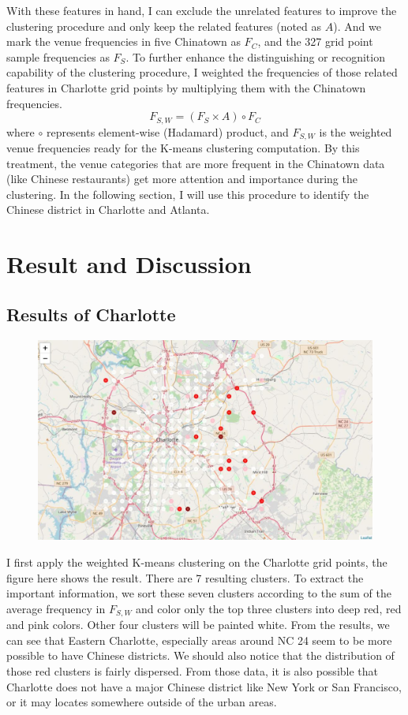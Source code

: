 \documentclass{article}
\begin{document}
With these features in hand, I can exclude the unrelated features to improve the clustering procedure and only keep the related features (noted as $A$).
And we mark the venue frequencies in five Chinatown as $F_C$, and the 327 grid point sample frequencies as $F_S$.
To further enhance the distinguishing or recognition capability of the clustering procedure, I weighted the frequencies of those related features in Charlotte grid points by multiplying them with the Chinatown frequencies.
$$ F_{S, W} = (F_S \times A) \circ F_C $$
where $\circ$ represents element-wise (Hadamard) product, and $F_{S, W}$ is the weighted venue frequencies ready for the K-means clustering computation.
By this treatment, the venue categories that are more frequent in the Chinatown data (like Chinese restaurants) get more attention and importance during the clustering.
In the following section, I will use this procedure to identify the Chinese district in Charlotte and Atlanta.

\section{Result and Discussion}

\subsection{Results of Charlotte}

\begin{figure}[h!]
\includegraphics[width=1.0\textwidth]{cn4.jpg}
\centering
\end{figure}

I first apply the weighted K-means clustering on the Charlotte grid points, the figure here shows the result.
There are 7 resulting clusters.
To extract the important information, we sort these seven clusters according to the sum of the average frequency in $F_{S, W}$ and color only the top three clusters into deep red, red and pink colors.
Other four clusters will be painted white.
From the results, we can see that Eastern Charlotte, especially areas around NC 24 seem to be more possible to have Chinese districts.
We should also notice that the distribution of those red clusters is fairly dispersed.
From those data, it is also possible that Charlotte does not have a major Chinese district like New York or San Francisco, or it may locates somewhere outside of the urban areas.
\end{document}
